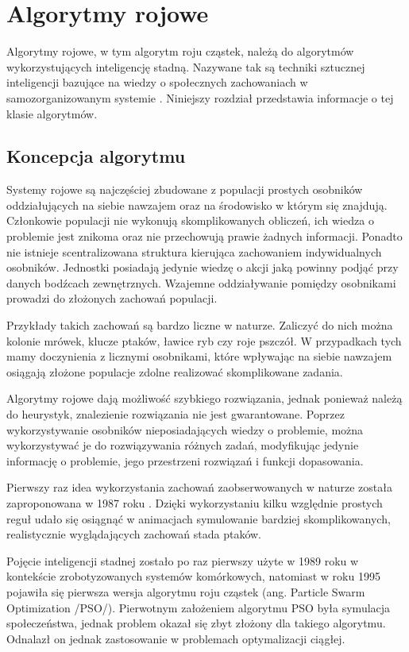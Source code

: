 \chapter{Algorytmy rojowe}
\label{cha:pso}
Algorytmy rojowe, w tym algorytm roju cząstek, należą do algorytmów wykorzystujących inteligencję stadną. Nazywane tak są techniki sztucznej inteligencji bazujące na wiedzy o społecznych zachowaniach w samozorganizowanym systemie \cite{psowstep}. Niniejszy rozdział przedstawia informacje o tej klasie algorytmów.

\section{Koncepcja algorytmu}
\label{sec:historiarojowych}

Systemy rojowe są najczęściej zbudowane z populacji prostych osobników oddziałujących na siebie nawzajem oraz na środowisko w którym się znajdują. Członkowie populacji nie wykonują skomplikowanych obliczeń, ich wiedza o problemie jest znikoma oraz nie przechowują prawie żadnych informacji. Ponadto nie istnieje scentralizowana struktura kierująca zachowaniem indywidualnych osobników. Jednostki posiadają jedynie wiedzę o akcji jaką powinny podjąć przy danych bodźcach zewnętrznych. Wzajemne oddziaływanie pomiędzy osobnikami prowadzi do złożonych zachowań populacji.

Przykłady takich zachowań są bardzo liczne w naturze. Zaliczyć do nich można kolonie mrówek, klucze ptaków, ławice ryb czy roje pszczół. W przypadkach tych mamy doczynienia z licznymi osobnikami, które wpływając na siebie nawzajem osiągają złożone populacje zdolne realizować skomplikowane zadania.

Algorytmy rojowe dają możliwość szybkiego rozwiązania, jednak ponieważ należą do heurystyk, znalezienie rozwiązania nie jest gwarantowane. Poprzez wykorzystywanie osobników nieposiadających wiedzy o problemie, można wykorzystywać je do rozwiązywania różnych zadań, modyfikując jedynie informację o problemie, jego przestrzeni rozwiązań i funkcji dopasowania. 


Pierwszy raz idea wykorzystania zachowań zaobserwowanych w naturze została zaproponowana w 1987 roku \cite{Reynolds87}. Dzięki wykorzystaniu kilku względnie prostych reguł udało się osiągnąć w animacjach symulowanie bardziej skomplikowanych, realistycznie wyglądających zachowań stada ptaków. 

Pojęcie inteligencji stadnej zostało po raz pierwszy użyte w 1989 roku \cite{BeniWang89} w kontekście zrobotyzowanych systemów komórkowych, natomiast w roku 1995 \cite{KennedyEberhart95} pojawiła się pierwsza wersja algorytmu roju cząstek (ang. Particle Swarm Optimization /PSO/). Pierwotnym założeniem algorytmu PSO była symulacja społeczeństwa, jednak problem okazał się zbyt złożony dla takiego algorytmu. Odnalazł on jednak zastosowanie w problemach optymalizacji ciągłej.

